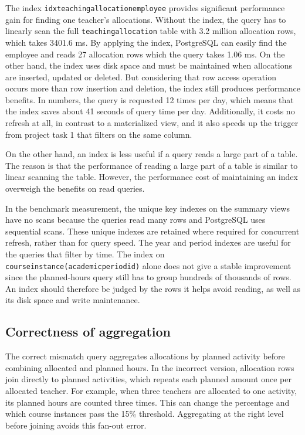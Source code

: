 \documentclass[a4paper]{scrartcl}
\renewcommand{\_}{\textunderscore\allowbreak}
\begin{document}
The index \texttt{idx\_teaching\_allocation\_employee} provides significant performance gain for finding one teacher's allocations. Without the index, the query has to linearly scan the full \texttt{teaching\_allocation} table with 3.2 million allocation rows, which takes 3401.6 ms. By applying the index, PostgreSQL can easily find the employee and reads 27 allocation rows which the query takes 1.06 ms. On the other hand, the index uses disk space and must be maintained when allocations are inserted, updated or deleted. But considering that row access operation occurs more than row insertion and deletion, the index still produces performance benefits. In numbers, the query is requested 12 times per day, which means that the index saves about 41 seconds of query time per day. Additionally, it costs no refresh at all, in contrast to a materialized view, and it also speeds up the trigger from project task 1 that filters on the same column.

On the other hand, an index is less useful if a query reads a large part of a table. The reason is that the performance of reading a large part of a table is similar to linear scanning the table. However, the performance cost of maintaining an index overweigh the benefits on read queries.

In the benchmark measurement, the unique key indexes on the summary views have no scans because the queries read many rows and PostgreSQL uses sequential scans. These unique indexes are retained where required for concurrent refresh, rather than for query speed. The year and period indexes are useful for the queries that filter by time. The index on \texttt{course\_instance(academic\_period\_id)} alone does not give a stable improvement since the planned-hours query still has to group hundreds of thousands of rows. An index should therefore be judged by the rows it helps avoid reading, as well as its disk space and write maintenance.

\subsection{Correctness of aggregation}

The correct mismatch query aggregates allocations by planned activity before combining allocated and planned hours. In the incorrect version, allocation rows join directly to planned activities, which repeats each planned amount once per allocated teacher. For example, when three teachers are allocated to one activity, its planned hours are counted three times. This can change the percentage and which course instances pass the 15\% threshold. Aggregating at the right level before joining avoids this fan-out error.
\end{document}
